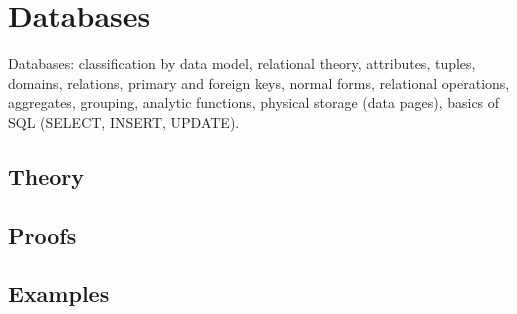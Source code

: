 
\section{Databases}
\label{sec:2.3b.09-databases}

\begin{ticket}
Databases: classification by data model, relational theory, attributes, tuples, domains, relations, primary and foreign keys, normal forms, relational operations, aggregates, grouping, analytic functions, physical storage (data pages), basics of SQL (SELECT, INSERT, UPDATE).
\end{ticket}

\subsection*{Theory}

\subsection*{Proofs}

\subsection*{Examples}
